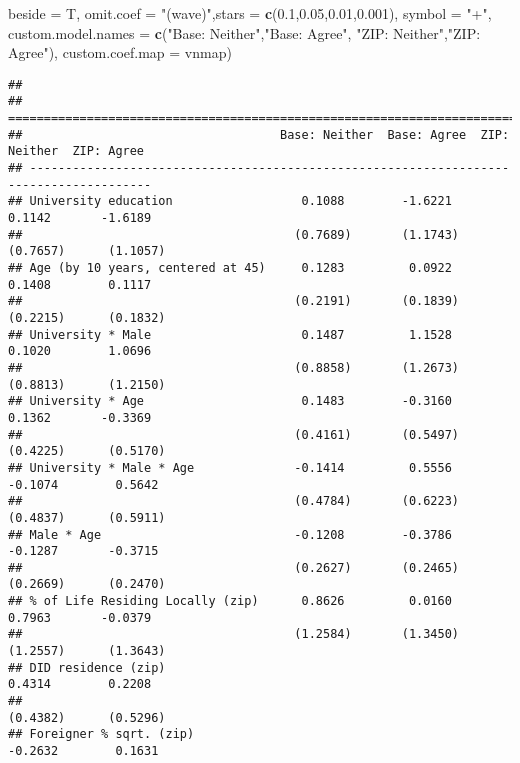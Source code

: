 \documentclass[
]{article}
\newenvironment{Shaded}{\begin{snugshade}}{\end{snugshade}}
\newcommand{\DataTypeTok}[1]{\textcolor[rgb]{0.13,0.29,0.53}{#1}}
\newcommand{\FloatTok}[1]{\textcolor[rgb]{0.00,0.00,0.81}{#1}}
\newcommand{\KeywordTok}[1]{\textcolor[rgb]{0.13,0.29,0.53}{\textbf{#1}}}
\newcommand{\NormalTok}[1]{#1}
\newcommand{\StringTok}[1]{\textcolor[rgb]{0.31,0.60,0.02}{#1}}
\begin{document}
\begin{Shaded}
\begin{Highlighting}[]
          \DataTypeTok{beside =}\NormalTok{ T,}
          \DataTypeTok{omit.coef =} \StringTok{"(wave)"}\NormalTok{,}\DataTypeTok{stars =} \KeywordTok{c}\NormalTok{(}\FloatTok{0.1}\NormalTok{,}\FloatTok{0.05}\NormalTok{,}\FloatTok{0.01}\NormalTok{,}\FloatTok{0.001}\NormalTok{), }\DataTypeTok{symbol =} \StringTok{"+"}\NormalTok{, }
          \DataTypeTok{custom.model.names =} \KeywordTok{c}\NormalTok{(}\StringTok{"Base: Neither"}\NormalTok{,}\StringTok{"Base: Agree"}\NormalTok{,}
                                 \StringTok{"ZIP: Neither"}\NormalTok{,}\StringTok{"ZIP: Agree"}\NormalTok{),}
          \DataTypeTok{custom.coef.map =}\NormalTok{ vnmap)}
\end{Highlighting}
\end{Shaded}

\begin{verbatim}
## 
## =======================================================================================
##                                    Base: Neither  Base: Agree  ZIP: Neither  ZIP: Agree
## ---------------------------------------------------------------------------------------
## University education                  0.1088        -1.6221       0.1142       -1.6189 
##                                      (0.7689)       (1.1743)     (0.7657)      (1.1057)
## Age (by 10 years, centered at 45)     0.1283         0.0922       0.1408        0.1117 
##                                      (0.2191)       (0.1839)     (0.2215)      (0.1832)
## University * Male                     0.1487         1.1528       0.1020        1.0696 
##                                      (0.8858)       (1.2673)     (0.8813)      (1.2150)
## University * Age                      0.1483        -0.3160       0.1362       -0.3369 
##                                      (0.4161)       (0.5497)     (0.4225)      (0.5170)
## University * Male * Age              -0.1414         0.5556      -0.1074        0.5642 
##                                      (0.4784)       (0.6223)     (0.4837)      (0.5911)
## Male * Age                           -0.1208        -0.3786      -0.1287       -0.3715 
##                                      (0.2627)       (0.2465)     (0.2669)      (0.2470)
## % of Life Residing Locally (zip)      0.8626         0.0160       0.7963       -0.0379 
##                                      (1.2584)       (1.3450)     (1.2557)      (1.3643)
## DID residence (zip)                                               0.4314        0.2208 
##                                                                  (0.4382)      (0.5296)
## Foreigner % sqrt. (zip)                                          -0.2632        0.1631 

\end{verbatim}
\end{document}
